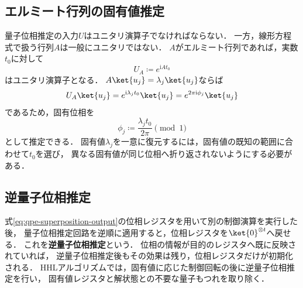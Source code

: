 \subsection{エルミート行列の固有値推定}
\label{subsec:qpe-hermitian-eigenvalues}

量子位相推定の入力$U$はユニタリ演算子でなければならない．
一方，線形方程式で扱う行列$A$は一般にユニタリではない．
$A$がエルミート行列であれば，実数$t_0$に対して
\begin{equation}
  U_A
  \coloneq
  e^{\mathrm{i}At_0}
  \label{eq:qpe-hamiltonian-unitary}
\end{equation}
はユニタリ演算子となる．
$A\ket{u_j}=\lambda_j\ket{u_j}$ならば
\begin{align*}
  U_A\ket{u_j}
  =
  e^{\mathrm{i}\lambda_jt_0}\ket{u_j}
  =
  e^{2\pi\mathrm{i}\phi_j}\ket{u_j}
\end{align*}
であるため，固有位相を
\begin{equation}
  \phi_j
  \coloneq
  \frac{\lambda_jt_0}{2\pi}
  \pmod{1}
  \label{eq:eigenvalue-to-phase}
\end{equation}
として推定できる．
固有値$\lambda_j$を一意に復元するには，固有値の既知の範囲に合わせて$t_0$を選び，
異なる固有値が同じ位相へ折り返されないようにする必要がある．

\subsection{逆量子位相推定}
\label{subsec:inverse-quantum-phase-estimation}

式\eqref{eq:qpe-superposition-output}の位相レジスタを用いて別の制御演算を実行した後，
量子位相推定回路を逆順に適用すると，位相レジスタを$\ket{0}^{\otimes t}$へ戻せる．
これを\textbf{逆量子位相推定}という．
位相の情報が目的のレジスタへ既に反映されていれば，
逆量子位相推定後もその効果は残り，位相レジスタだけが初期化される．
HHLアルゴリズムでは，固有値に応じた制御回転の後に逆量子位相推定を行い，
固有値レジスタと解状態との不要な量子もつれを取り除く．
